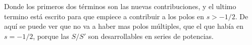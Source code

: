 Donde los primeros dos términos son las nuevas contribuciones, y el ultimo termino está escrito para que empiece a contribuir a los polos en  $s > -1/2$. De aquí se puede ver que no va a haber mas polos múltiples, que el que había en $s=-1/2$, porque las $S / S' $ son desarrollables en series de potencias.


\begin{comment}
Las primeras 3 integrales se pueden realizar analíticamente de manera sencilla, dado que son todas series de potencias, la integral angular va a tener que ser evaluada numéricamente dado que es de la forma (parametrizando $\lambda = e ^{i \theta}$ y llamando $M_c$ a todo el termino adentro del logaritmo) :

\begin{equation}
\begin{array}{c}

\frac{1}{2 \pi i} \int _{\pi /2 } ^{- \pi /2} 
\frac{e ^{-2 s i \theta} d \theta}{M [e ^{i \theta}]} \\

\Bigg[

\frac{
e ^{- \frac{i \alpha (Log[2 L] + i \theta)}{2 e ^{i \theta} }} e ^{2 i L e ^{i \theta}}
}{\Gamma \left( 1 - \frac{i \alpha}{2 e ^{i \theta}} \right)}
	\left(
		\left(
			2 i L -
			\frac{i \alpha}{2 e ^{2 i \theta} } + 
			\frac{i \alpha( Log[2 L ] + e ^{i \theta} ) }{2 e^{2 i \theta}}
			- \frac{i \alpha \psi \left( 1 - \frac{i \alpha}{2 e ^{i \theta}}\right)}
				   {2 e ^{2 i \theta}}
			\right) S1 [e ^{i \theta}] +
		S1 ' [e ^{i \theta }]
		\right)
  \\

- \frac{
e ^{ \frac{i \alpha (Log[2 L] + i \theta)}{2 e ^{i \theta} }}
}{\Gamma \left( 1 + \frac{i \alpha}{2 e ^{i \theta}} \right)}
	\left(
		\left(
			\frac{i \alpha}{2 e ^{2 i \theta} } - 
			\frac{i \alpha( Log[2 L ] + e ^{i \theta} ) }{2 e^{2 i \theta}}
			+ \frac{i \alpha \psi \left( 1 + \frac{i \alpha}{2 e ^{i \theta}}\right)}
				   {2 e ^{2 i \theta}}
			\right) S2 [e ^{i \theta}] +
		S'2 [e ^{i \theta }]
		\right)


\Bigg]

\end{array}
\end{equation}

La cual va a dar una constante independiente de $\lambda$ y se puede calcular numéricamente.



\end{comment}
